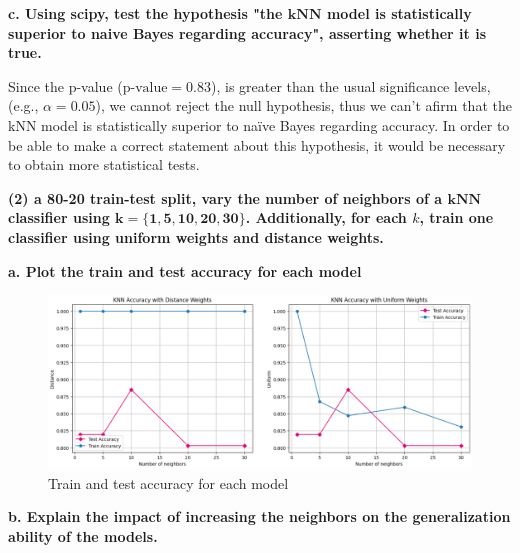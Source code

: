 \documentclass[12pt]{article}
\begin{document}
    \vspace{10pt}
    \textbf{c. Using scipy, test the hypothesis "the $\mathbf{kNN}$ model is statistically superior to naive Bayes regarding accuracy", asserting whether it is true.}

    \vspace{20pt}
    

    \vspace{10pt}
    Since the p-value ($\text{p-value} = 0.83$), is greater than the usual significance levels, (e.g., $\alpha = 0.05$), we cannot reject the null hypothesis, thus we can't afirm that the kNN model is statistically superior to naïve Bayes regarding accuracy.
    In order to be able to make a correct statement about this hypothesis, it would be necessary to obtain more statistical tests.

    \vspace{20pt}
    \textbf{(2) a 80-20 train-test split, vary the number of neighbors of a $\mathbf{kNN}$ classifier using $\mathbf{k=\{1, 5, 10, 20, 30\}}$. Additionally, for each $k$, train one classifier using uniform weights and distance weights.}

    \vspace{10pt}
    \textbf{a. Plot the train and test accuracy for each model}

    \vspace{20pt}
    

    \begin{figure}[H]
        \centering
        \includegraphics[width=12cm]{./Part II/2_a.png}
        \caption{Train and test accuracy for each model}
    \end{figure}

    \vspace{20pt}
    \textbf{b. Explain the impact of increasing the neighbors on the generalization ability of the models.}
\end{document}
